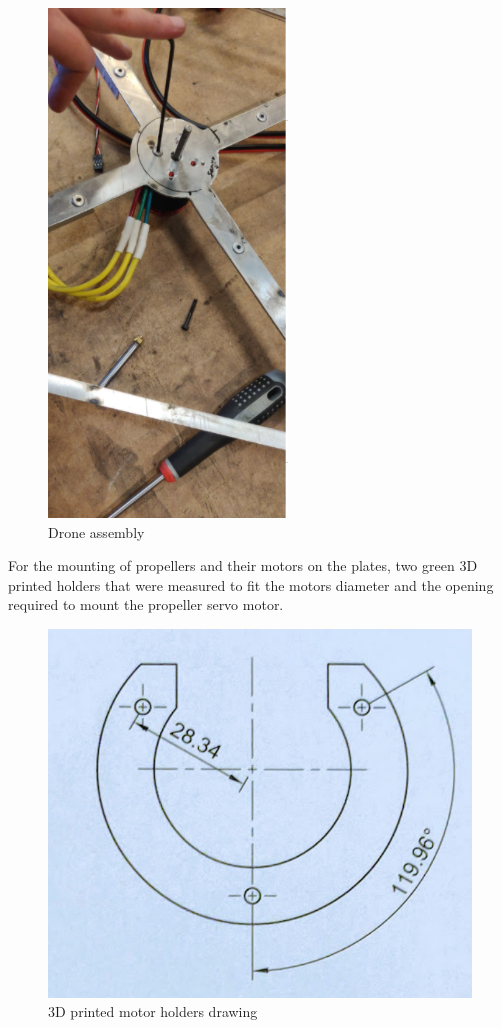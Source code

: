 \begin{figure}[h!]
  \centering
  \includegraphics[scale=0.7]{graphics/Drone/Drone.png}
  \caption{Drone assembly}
  \label{fig:Drone assembly}
\end{figure}



For the mounting of propellers and their motors on the plates, two green 3D printed holders that were measured to fit the motors diameter and the opening required to mount the propeller servo motor.

\begin{figure}[h!]
    \centering
    \includegraphics[scale=0.4]{graphics/Drone/ServoHolder.png}
    \caption{3D printed motor holders drawing}
     \label{fig:3D printed motor holders drawing}
\end{figure} 


